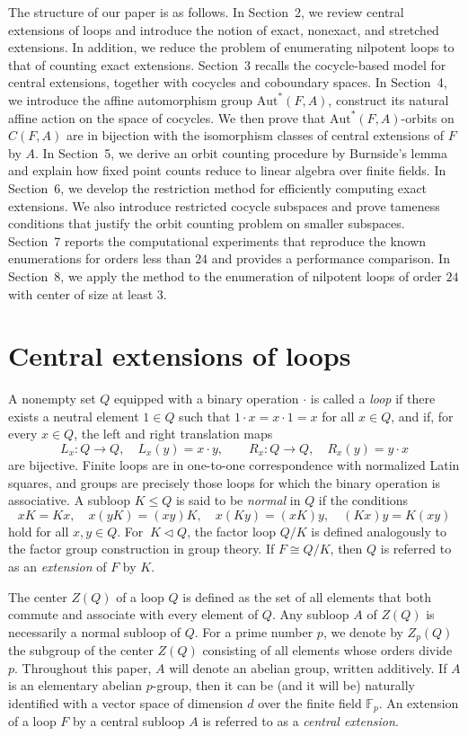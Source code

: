 \documentclass[12pt,a4paper]{amsart}
\theoremstyle{definition}
\begin{document}
The structure of our paper is as follows. In Section~2, we review central extensions of loops and introduce the notion of exact, nonexact, and stretched extensions. In addition, we reduce the problem of enumerating nilpotent loops to that of counting exact extensions. Section~3 recalls the cocycle-based model for central extensions, together with cocycles and coboundary spaces. In Section~4, we introduce the affine automorphism group $\mathrm{Aut}^{\!*}(F, A)$, construct its natural affine action on the space of cocycles. We then prove that $\mathrm{Aut}^{\!*}(F, A)$-orbits on $C(F, A)$  are in bijection with the isomorphism classes of central extensions of $F$ by $A$. In Section~5, we derive an orbit counting procedure by Burnside's lemma and explain how fixed point counts reduce to linear algebra over finite fields. In Section~6, we develop the restriction method for efficiently computing exact extensions. We also introduce restricted cocycle subspaces and prove tameness conditions that justify the orbit counting problem on smaller subspaces. Section~7 reports the computational experiments that reproduce the known enumerations for orders less than $24$  and provides a performance comparison. In Section~8, we apply the method to the enumeration of nilpotent loops of order $24$ with center of size at least $3$.

\section{Central extensions of loops} 

A nonempty set $Q$ equipped with a binary operation $\cdot$ is called a \textit{loop} if there exists a neutral element $1 \in Q$ such that $1\cdot x = x\cdot 1 = x$ for all $x \in Q$, and if, for every $x \in Q$, the left and right translation maps
\[
L_x \colon Q \to Q,\quad L_x(y) = x\cdot y,\qquad
R_x \colon Q \to Q,\quad R_x(y) = y\cdot x
\]
are bijective. Finite loops are in one-to-one correspondence with normalized Latin squares, and groups are precisely those loops for which the binary operation is associative. A subloop $K \leq Q$ is said to be \textit{normal} in $Q$ if the conditions
\[
xK = Kx,\quad x(yK) = (xy)K,\quad x(Ky) = (xK)y,\quad (Kx)y = K(xy)
\]
hold for all $x,y \in Q$. For $ \ K\triangleleft Q$, the factor loop $Q/K$ is defined analogously to the factor group construction in group theory. If $F \cong Q/K$, then $Q$ is referred to as an \textit{extension} of $F$ by $K$.

The center $Z(Q)$ of a loop $Q$ is defined as the set of all elements that both commute and associate with every element of $Q$. Any subloop $A$ of $Z(Q)$ is necessarily a normal subloop of $Q$. For a prime number $p$, we denote by $Z_p(Q)$ the subgroup of the center $Z(Q)$ consisting of all elements whose orders divide $p$. Throughout this paper, $A$ will denote an abelian group, written additively. If $A$ is an elementary abelian $p$-group, then it can be (and it will be) naturally identified with a vector space of dimension $d$ over the finite field $\mathbb{F}_{p}$. An extension of a loop $F$ by a central subloop $A$ is referred to as a \textit{central extension}.
\end{document}
